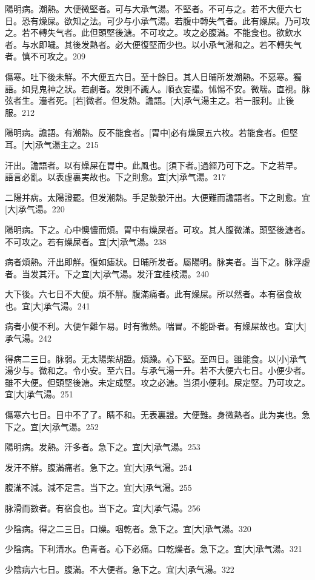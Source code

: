 \documentclass[12pt,oneside,UTF8,b5paper]{ctexbook}她她她她她她她
\begin{document}
陽明病。潮熱。大便微堅者。可与大承气湯。不堅者。不可与之。若不大便六七日。恐有燥屎。欲知之法。可少与小承气湯。若腹中轉失气者。此有燥屎。乃可攻之。若不轉失气者。此但頭堅後溏。不可攻之。攻之必腹滿。不能食也。欲飲水者。与水即噦。其後发熱者。必大便復堅而少也。以小承气湯和之。若不轉失气者。慎不可攻之。209

傷寒。吐下後未觧。不大便五六日。至十餘日。其人日晡所发潮熱。不惡寒。獨語。如見鬼神之狀。若劇者。发則不識人。順衣妄撮。怵惕不安。微喘。直視。脉弦者生。濇者死。[若]微者。但发熱。譫語。[大]承气湯主之。若一服利。止後服。212

陽明病。譫語。有潮熱。反不能食者。[胃中]必有燥屎五六枚。若能食者。但堅耳。[大]承气湯主之。215

汗出。譫語者。以有燥屎在胃中。此風也。[須下者。]過經乃可下之。下之若早。語言必亂。以表虚裏実故也。下之則愈。宜[大]承气湯。217

二陽并病。太陽證罷。但发潮熱。手足漐漐汗出。大便難而譫語者。下之則愈。宜[大]承气湯。220

陽明病。下之。心中懊憹而煩。胃中有燥屎者。可攻。其人腹微滿。頭堅後溏者。不可攻之。若有燥屎者。宜[大]承气湯。238

病者煩熱。汗出即觧。復如瘧狀。日晡所发者。屬陽明。脉実者。当下之。脉浮虚者。当发其汗。下之宜[大]承气湯。发汗宜桂枝湯。240

大下後。六七日不大便。煩不觧。腹滿痛者。此有燥屎。所以然者。本有宿食故也。宜[大]承气湯。241

病者小便不利。大便乍難乍易。时有微熱。喘冒。不能卧者。有燥屎故也。宜[大]承气湯。242

得病二三日。脉弱。无太陽柴胡證。煩躁。心下堅。至四日。雖能食。以[小]承气湯少与。微和之。令小安。至六日。与承气湯一升。若不大便六七日。小便少者。雖不大便。但頭堅後溏。未定成堅。攻之必溏。当須小便利。屎定堅。乃可攻之。宜[大]承气湯。251

傷寒六七日。目中不了了。睛不和。无表裏證。大便難。身微熱者。此为実也。急下之。宜[大]承气湯。252

陽明病。发熱。汗多者。急下之。宜[大]承气湯。253

发汗不觧。腹滿痛者。急下之。宜[大]承气湯。254

腹滿不減。減不足言。当下之。宜[大]承气湯。255

脉滑而數者。有宿食也。当下之。宜[大]承气湯。256

少陰病。得之二三日。口燥。咽乾者。急下之。宜[大]承气湯。320

少陰病。下利清水。色青者。心下必痛。口乾燥者。急下之。宜[大]承气湯。321

少陰病六七日。腹滿。不大便者。急下之。宜[大]承气湯。322
\end{document}
